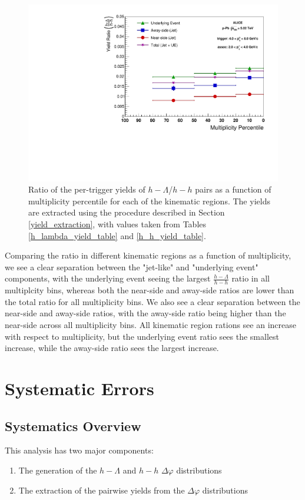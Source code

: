 \documentclass[ALICE,manyauthors]{ALICE_analysis_notes}
\begin{document}
\begin{figure}[ht]
\centering
\includegraphics[width=6in]{figures/v0_ratio_plot_2_4.pdf}
\caption{Ratio of the per-trigger yields of $h-\Lambda$/$h-h$ pairs as a function of multiplicity percentile for each of the kinematic regions. The yields are extracted using the procedure described in Section {\ref{yield_extraction}}, with values taken from Tables {\ref{h_lambda_yield_table}} and {\ref{h_h_yield_table}}.}
\label{ratioplot}
\end{figure}

Comparing the ratio in different kinematic regions as a function of multiplicity, we see a clear separation between the "jet-like" and "underlying event" components, with the underlying event seeing the largest $\frac{h-\Lambda}{h-h}$ ratio in all multiplcity bins, whereas both the near-side and away-side ratios are lower than the total ratio for all multiplicity bins. We also see a clear separation between the near-side and away-side ratios, with the away-side ratio being higher than the near-side across all multiplicity bins. All kinematic region rations see an increase with respect to multiplicity, but the underlying event ratio sees the smallest increase, while the away-side ratio sees the largest increase.

\section{Systematic Errors}
\label{systematics}
\subsection{Systematics Overview}
This analysis has two major components:
\begin{enumerate}
\item The generation of the $h-\Lambda$ and $h-h$ $\Delta\varphi$ distributions
\item The extraction of the pairwise yields from the $\Delta\varphi$ distributions
\end{enumerate}
\end{document}
